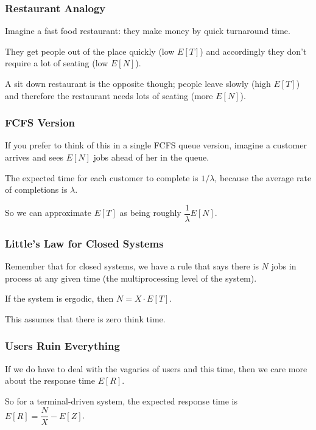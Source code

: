 \begin{frame}
\frametitle{Restaurant Analogy}

Imagine a fast food restaurant: they make money by quick turnaround time. 

They get people out of the place quickly (low $E[T]$) and accordingly they don't require a lot of seating (low $E[N]$). 

A sit down restaurant is the opposite though; people leave slowly (high $E[T]$) and therefore the restaurant needs lots of seating (more $E[N]$). 


\end{frame}



\begin{frame}
\frametitle{FCFS Version}

If you prefer to think of this in a single FCFS queue version, imagine a customer arrives and sees $E[N]$ jobs ahead of her in the queue. 

The expected time for each customer to complete is $1/\lambda$, because the average rate of completions is $\lambda $. 

So we can approximate $E[T]$ as being roughly $\dfrac{1}{\lambda}E[N]$.

\end{frame}



\begin{frame}
\frametitle{Little's Law for Closed Systems}

Remember that for closed systems, we have a rule that says there is $N$ jobs in process at any given time (the multiprocessing level of the system). 

If the system is ergodic, then $N = X \cdot E[T]$.

 This assumes that there is zero think time.

\end{frame}



\begin{frame}
\frametitle{Users Ruin Everything}

If we do have to deal with the vagaries of users and this time, then we care more about the response time $E[R]$. 

So for a terminal-driven system, the expected response time is $E[R] = \dfrac{N}{X} - E[Z]$. 

\end{frame}



